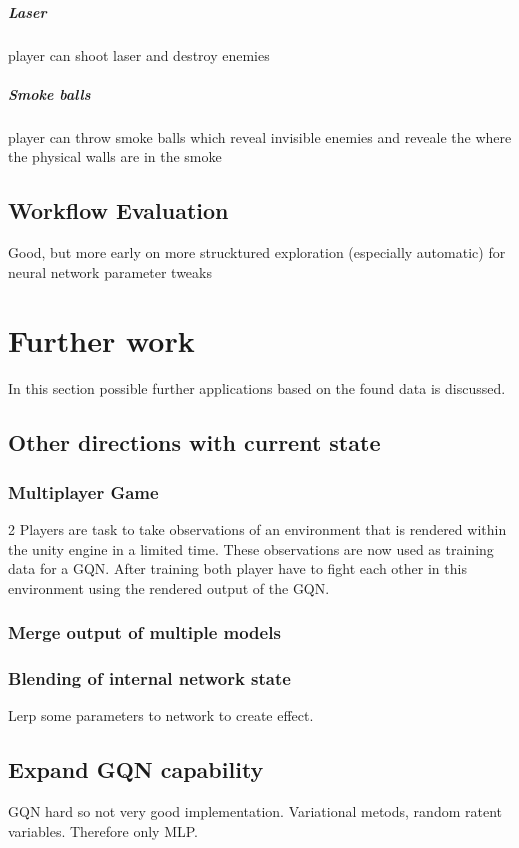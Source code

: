 \documentclass[a4paper, twoside, 10pt]{report}
\begin{document}
{\paragraph{Laser}
player can shoot laser and destroy enemies

\paragraph{Smoke balls}
player can throw smoke balls which reveal invisible enemies and reveale the where the physical walls are in the smoke



\section{Workflow Evaluation}
Good, but more early on more strucktured exploration (especially automatic) for neural network parameter tweaks



\chapter{Further work}
In this section possible further applications based on the found data is discussed.

\section{Other directions with current state}
\subsection{Multiplayer Game}
2 Players are task to take observations of an environment that is rendered within the unity engine in a limited time. These observations  are now used as training data for a GQN. After training both player have to fight each other in this environment using the rendered output of the GQN.

\subsection{Merge output of multiple models}
\subsection{Blending of internal network state}
Lerp some parameters to network to create effect.

\section{Expand GQN capability}
GQN hard so not very good implementation. Variational metods, random ratent variables. Therefore only MLP.

}
\end{document}
